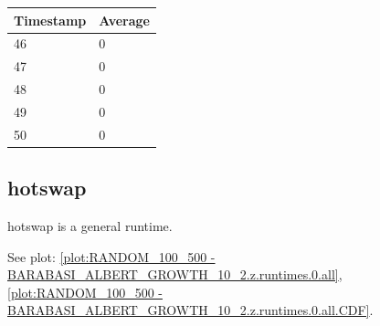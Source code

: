 \begin{tabular}{|l||l|}
\hline
	\textbf{Timestamp} & \textbf{Average} \\ \hline
	46 & 0 \\ \hline
	47 & 0 \\ \hline
	48 & 0 \\ \hline
	49 & 0 \\ \hline
	50 & 0 \\ \hline
\end{tabular}

\subsection{hotswap}
hotswap is a general runtime.

See plot: \ref{plot:RANDOM_100_500 - BARABASI_ALBERT_GROWTH_10_2.z.runtimes.0.all}, \ref{plot:RANDOM_100_500 - BARABASI_ALBERT_GROWTH_10_2.z.runtimes.0.all.CDF}.

